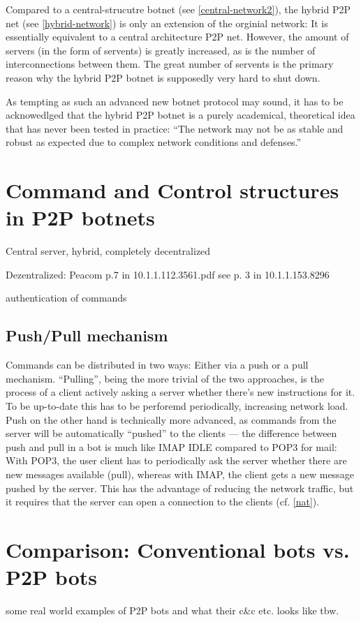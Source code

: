 \documentclass{llncs}
\begin{document}
Compared to a central-strucutre botnet (see \ref{central-network2}),
the hybrid P2P net (see \ref{hybrid-network}) is only an extension of the
orginial network: It is essentially equivalent to a central
architecture P2P net. However, the amount of servers (in the form of
servents) is greatly increased, as is the number of interconnections
between them. The great number of servents is the primary reason why
the hybrid P2P botnet is supposedly very hard to shut
down.\cite{td1sc}

As tempting as such an advanced new botnet protocol may sound, it has
to be acknowedlged that the hybrid P2P botnet is a purely academical,
theoretical idea that has never been tested in practice: ``The network
may not be as stable and robust as expected due to complex network
conditions and defenses.''\cite{wang2009systematic}

\section{Command and Control structures in P2P botnets}
Central server, hybrid, completely decentralized

Dezentralized: Peacom p.7 in 10.1.1.112.3561.pdf
see p. 3 in 10.1.1.153.8296

authentication of commands

\subsection{Push/Pull mechanism}
\label{pushpull}
Commands can be distributed in two ways: Either via a push or a pull mechanism. ``Pulling'', being the more trivial of the two approaches, is the process of a client actively asking a server whether there's new instructions for it. To be up-to-date this has to be perforemd periodically, increasing network load.
Push on the other hand is technically more advanced, as commands from the server will be automatically ``pushed'' to the clients --- the difference between push and pull in a bot is much like IMAP IDLE compared to POP3 for mail: With POP3, the user client has to periodically ask the server whether there are new messages available (pull), whereas with IMAP, the client gets a new message pushed by the server. This has the advantage of reducing the network traffic, but it requires that the server can open a connection to the clients (cf. \ref{nat}). 

\section{Comparison: Conventional bots vs. P2P bots}
some real world examples of P2P bots and what their c\&c etc. looks like
tbw.
\end{document}
